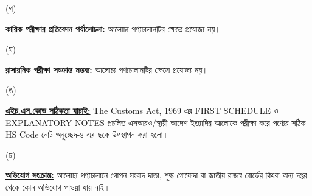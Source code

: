 \documentclass[12pt]{article}
\begin{document}
\begin{minipage}[t]{0.05\linewidth}
\hspace{1em}
\end{minipage}
\begin{minipage}[t]{0.05\linewidth}
(গ)
\end{minipage}
\begin{minipage}[t]{0.90\linewidth}
\underline{\textbf{কায়িক পরীক্ষার প্রতিবেদন পর্যালোচনা:}}
আলোচ্য পণ্যচালানটির ক্ষেত্রে প্রযোজ্য নয়।
\\
\end{minipage}
\begin{minipage}[t]{0.05\linewidth}
\hspace{1em}
\end{minipage}
\begin{minipage}[t]{0.05\linewidth}
(ঘ)
\end{minipage}
\begin{minipage}[t]{0.90\linewidth}
\underline{\textbf{রাসায়নিক পরীক্ষা সংক্রান্ত মন্তব্য:}}
আলোচ্য পণ্যচালানটির ক্ষেত্রে প্রযোজ্য নয়।
\\
\end{minipage}
\begin{minipage}[t]{0.05\linewidth}
\hspace{1em}
\end{minipage}
\begin{minipage}[t]{0.05\linewidth}
(ঙ)
\end{minipage}
\begin{minipage}[t]{0.90\linewidth}
\underline{\textbf{এইচ.এস.কোড সঠিকতা যাচাই:}}
The Customs Act, 1969 এর FIRST SCHEDULE ও
EXPLANATORY NOTES প্রচলিত এসআরও/স্থায়ী আদেশ ইত্যাদির আলোকে পরীক্ষা করে পণ্যের সঠিক HS Code নোট অনুচ্ছেদ-৪
এর ছকে উপস্থাপন করা হলো।
\\
\end{minipage}
\begin{minipage}[t]{0.05\linewidth}
\hspace{1em}
\end{minipage}
\begin{minipage}[t]{0.05\linewidth}
(চ)
\end{minipage}
\begin{minipage}[t]{0.90\linewidth}
\underline{\textbf{অভিযোগ সংক্রান্ত:}} আলোচ্য পণ্যচালানে
গোপন সংবাদ দাতা, শুল্ক গোযেন্দা বা
জাতীয় রাজস্ব বোর্ডের কিংবা অন্য দপ্তর থেকে
কোন অভিযোগ পাওয়া যায় নাই।
\\
\end{minipage}
\begin{minipage}[t]{0.05\linewidth}
\hspace{1em}
\end{minipage}
\end{document}
